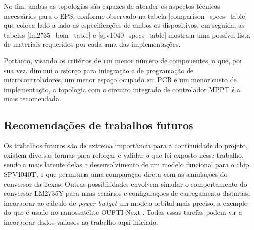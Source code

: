 No fim, ambas as topologias são capazes de atender os aspectos técnicos necessários para o EPS, conforme observado na tabela \ref{comparison_specs_table} que coloca lado a lado as especificações de ambos os dispositivos, em seguida, as tabelas \ref{lm2735_bom_table} e \ref{spv1040_specs_table} mostram uma possível lista de materiais requeridos por cada uma das implementações.

Portanto, visando os critérios de um menor número de componentes, o que, por sua vez, diminui o esforço para integração e de programação de microcontroladores, um menor espaço ocupado em PCB e um menor custo de implementação, a topologia com o circuito integrado de controlador MPPT é a mais recomendada.

\subsection*{Recomendações de trabalhos futuros}

Os trabalhos futuros são de extrema importância para a continuidade do projeto, existem diversas formas para reforçar e validar o que foi exposto nesse trabalho, sendo a mais latente delas o desenvolvimento de um modelo funcional para o chip SPV1040T, o que permitiria uma comparação direta com as simulações do conversor da Texas. Outras possibilidades envolvem simular o comportamento do conversor LM2735Y para mais cenários e configurações de carregamento distintas, incorporar ao cálculo de \textit{power budget} um modelo orbital mais preciso, a exemplo do que é usado no nanossatélite OUFTI-Next \cite{orbit_dynamics_ref}. Todas essas tarefas podem vir a incorporar dados valiosos ao trabalho aqui iniciado. 


